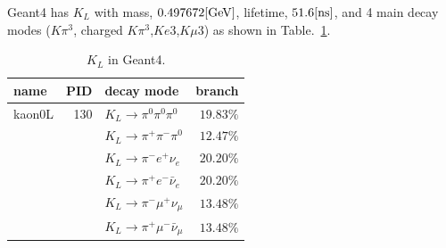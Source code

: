 \documentclass[a4paper,12pt]{article}
\begin{document}
	
 Geant4 has $K_L$ with mass, $0.497672 [{\rm GeV}]$, lifetime,
 $51.6 [{\rm ns}]$, and 4 main decay modes ($K\pi^3$, charged
 $K\pi^3$,$Ke3$,$K\mu3$) as shown in Table.~\ref{tab:g4KL}. 
 \begin{table}[H]
  \caption{$K_L$ in Geant4.\label{tab:g4KL}}
  \begin{tabular}{l|rlr}
   name&PID &decay mode&branch \\\hline
   kaon0L&130 &$K_L\to\pi^0\pi^0\pi^0$&$19.83\%$\\
   &&$K_L\to\pi^+\pi^-\pi^0$&$12.47\%$\\
   &&$K_L\to\pi^-e^+\nu_e$&$20.20\%$\\
   &&$K_L\to\pi^+e^-\bar\nu_e$&$20.20\%$\\
   &&$K_L\to\pi^-\mu^+\nu_\mu$&$13.48\%$\\
   &&$K_L\to\pi^+\mu^-\bar\nu_\mu$&$13.48\%$\\
  \end{tabular}
 \end{table}
\end{document}
